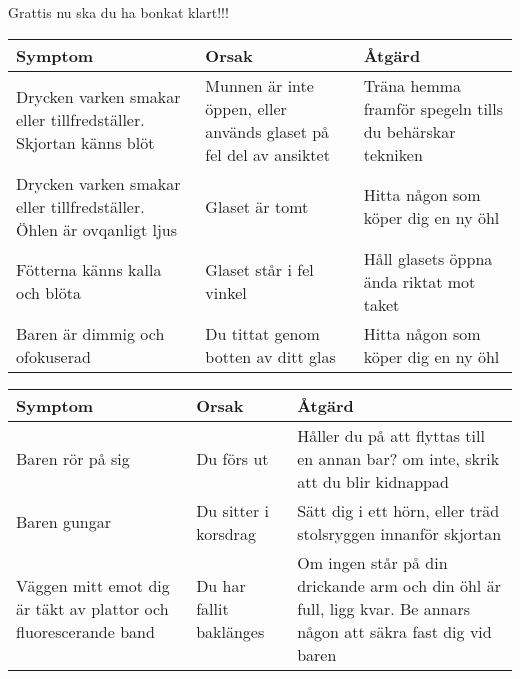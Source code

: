 Grattis nu ska du ha bonkat klart!!!\newpage


\begin{adjustbox}{angle=-90}
  \begin{tabular}{|p{0.3\textheight}|p{0.3\textheight}|p{0.3\textheight}|}
    \hline
    \textbf{Symptom} & \textbf{Orsak} & \textbf{Åtgärd} \\
    \hline
    Drycken varken smakar eller tillfredställer. Skjortan känns blöt & 
    Munnen är inte öppen, eller används glaset på fel del av ansiktet & 
    Träna hemma framför spegeln tills du behärskar tekniken \\
    \hline
    Drycken varken smakar eller tillfredställer. Öhlen är ovqanligt ljus &
    Glaset är tomt &
    Hitta någon som köper dig en ny öhl \\
    \hline
    Fötterna känns kalla och blöta &
    Glaset står i fel vinkel &
    Håll glasets öppna ända riktat mot taket \\
    \hline
    Baren är dimmig och ofokuserad &
    Du tittat genom botten av ditt glas &
    Hitta någon som köper dig en ny öhl \\
    \hline
    
  \end{tabular}
\end{adjustbox}

\begin{adjustbox}{angle=-90}
  \begin{tabular}{|p{0.3\textheight}|p{0.3\textheight}|p{0.3\textheight}|}
    \hline
    \textbf{Symptom} & \textbf{Orsak} & \textbf{Åtgärd} \\
    \hline
    Baren rör på sig &
    Du förs ut &
    Håller du på att flyttas till en annan bar? om inte, skrik att du blir kidnappad \\
    \hline
    Baren gungar &
    Du sitter i korsdrag &
    Sätt dig i ett hörn, eller träd stolsryggen innanför skjortan \\
    \hline
    Väggen mitt emot dig är täkt av plattor och fluorescerande band &
    Du har fallit baklänges &
    Om ingen står på din drickande arm och din öhl är full, ligg kvar. Be annars någon att säkra fast dig vid baren \\
    \hline
  \end{tabular}
\end{adjustbox}


